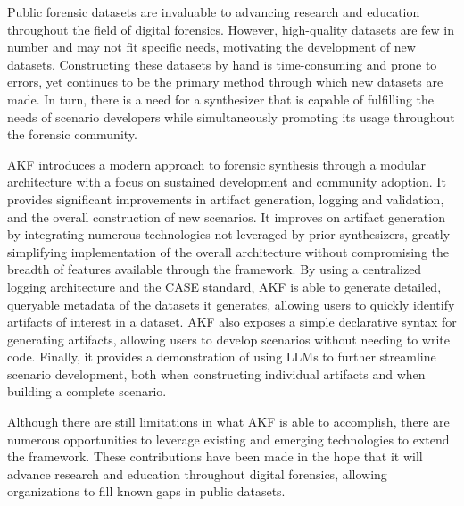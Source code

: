 Public forensic datasets are invaluable to advancing research and
education throughout the field of digital forensics. However,
high-quality datasets are few in number and may not fit specific needs,
motivating the development of new datasets. Constructing these datasets
by hand is time-consuming and prone to errors, yet continues to be the
primary method through which new datasets are made. In turn, there is a
need for a synthesizer that is capable of fulfilling the needs of
scenario developers while simultaneously promoting its usage throughout
the forensic community.

AKF introduces a modern approach to forensic synthesis through a modular
architecture with a focus on sustained development and community
adoption. It provides significant improvements in artifact generation,
logging and validation, and the overall construction of new scenarios.
It improves on artifact generation by integrating numerous technologies
not leveraged by prior synthesizers, greatly simplifying implementation
of the overall architecture without compromising the breadth of features
available through the framework. By using a centralized logging
architecture and the CASE standard, AKF is able to generate detailed,
queryable metadata of the datasets it generates, allowing users to
quickly identify artifacts of interest in a dataset. AKF also exposes a
simple declarative syntax for generating artifacts, allowing users to
develop scenarios without needing to write code. Finally, it provides a
demonstration of using LLMs to further streamline scenario development,
both when constructing individual artifacts and when building a complete
scenario.

Although there are still limitations in what AKF is able to accomplish,
there are numerous opportunities to leverage existing and emerging
technologies to extend the framework. These contributions have been made
in the hope that it will advance research and education throughout
digital forensics, allowing organizations to fill known gaps in public
datasets.
